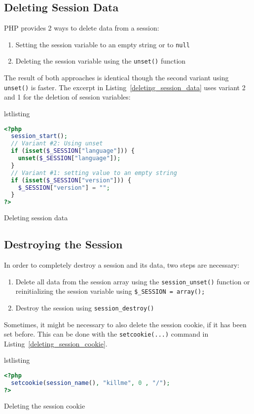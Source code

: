 \documentclass[a4paper, justified, notoc]{tufte-handout} %
\makeatletter
\newenvironment{listing}[1][htbp]
  {\ifvmode\else\unskip\fi\begin{@tufte@float}[#1]{lstlisting}{}}
  {\end{@tufte@float} } %
\makeatother
\begin{document}
\subsection{Deleting Session Data} %
\label{sub:deleting_session_data}
PHP provides 2 ways to delete data from a session:
\begin{enumerate}
	\item Setting the session variable to an empty string or to \texttt{null}
	\item Deleting the session variable using the \texttt{unset()} function
\end{enumerate}
The result of both approaches is identical though the second variant using \texttt{unset()} is faster. 
The excerpt in Listing~\ref{deleting_session_data} uses variant 2 and 1 for the deletion of session variables:
\begin{listing}
\begin{lstlisting}[language=PHP]
<?php
  session_start();
  // Variant #2: Using unset
  if (isset($_SESSION["language"])) {
    unset($_SESSION["language"]);
  }
  // Variant #1: setting value to an empty string
  if (isset($_SESSION["version"])) {
    $_SESSION["version"] = "";
  }
?>
\end{lstlisting}
	\caption{Deleting session data}
	\label{deleting_session_data}
\end{listing}

\subsection{Destroying the Session} %
\label{sub:destroying_the_session}


In order to completely destroy a session and its data, two steps are necessary:
\begin{enumerate}
	\item Delete all data from the session array using the \texttt{session\_unset()} function or reinitializing the session variable using \texttt{\$\_SESSION = array();}
	\item Destroy the session using \texttt{session\_destroy()}
\end{enumerate}

Sometimes, it might be necessary to also delete the session cookie, if it has been set before. 
This can be done with the \texttt{setcookie(...)} command in Listing~\ref{deleting_session_cookie}.
\begin{listing}
\begin{lstlisting}[language=PHP]
<?php
  setcookie(session_name(), "killme", 0 , "/");
?>
\end{lstlisting}
	\caption{Deleting the session cookie}
	\label{deleting_session_cookie}
\end{listing}
\end{document}
